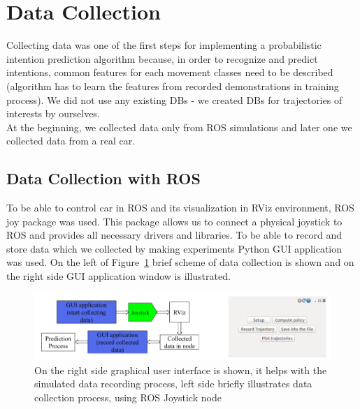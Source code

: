 \section{Data Collection}

Collecting data was one of the first steps for implementing a probabilistic intention prediction algorithm because, in order to recognize and predict intentions, common features for each movement classes need to be described (algorithm has to learn the features from recorded demonstrations in training process). We did not use any existing \glspl{DB} - we created \glspl{DB} for trajectories of interests by ourselves.  \\
At the beginning, we collected data only from \gls{ROS} simulations and later one we collected data from a real car.

\subsection{Data Collection with \gls{ROS}}

To be able to control car in \gls{ROS} and its visualization in \gls{RViz} environment, \gls{ROS} joy package was used. This package allows us to connect a physical joystick to \gls{ROS} and provides all necessary drivers and libraries. To be able to record and store data which we collected by making experiments Python GUI application was used. On the left of Figure~\ref{fig:GUIandJOY} brief scheme of data collection is shown and on the right side GUI application window is illustrated.

\begin{figure}[H]
	\centering  	
	\includegraphics[width=17cm]{img/ROS+GUI.png}
	\caption{On the right side graphical user interface is shown, it helps with the simulated data recording process, left side briefly illustrates data collection process, using \gls{ROS} Joystick node}
	\label{fig:GUIandJOY}    
\end{figure}


